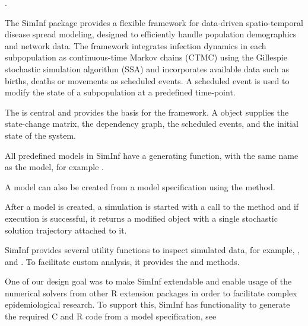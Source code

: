 \documentclass[letterpaper]{book}
\begin{document}
%
\begin{Value}
.
\end{Value}
%
\begin{Description}
The SimInf package provides a flexible framework for data-driven
spatio-temporal disease spread modeling, designed to efficiently
handle population demographics and network data. The framework
integrates infection dynamics in each subpopulation as
continuous-time Markov chains (CTMC) using the Gillespie
stochastic simulation algorithm (SSA) and incorporates available
data such as births, deaths or movements as scheduled events. A
scheduled event is used to modify the state of a subpopulation at
a predefined time-point.
\end{Description}
%
\begin{Details}
The  is central and provides the
basis for the framework. A 
object supplies the state-change matrix, the dependency graph, the
scheduled events, and the initial state of the system.

All predefined models in SimInf have a generating function, with
the same name as the model, for example .

A model can also be created from a model specification using the
 method.

After a model is created, a simulation is started with a call to
the  method and if execution is successful, it
returns a modified  object with a
single stochastic solution trajectory attached to it.

SimInf provides several utility functions to inspect simulated
data, for example, ,  and .
To facilitate custom analysis, it provides the
 and
 methods.

One of our design goal was to make SimInf extendable and enable
usage of the numerical solvers from other R extension packages in
order to facilitate complex epidemiological research.  To support
this, SimInf has functionality to generate the required C and R
code from a model specification, see
\end{Details}
\end{document}
